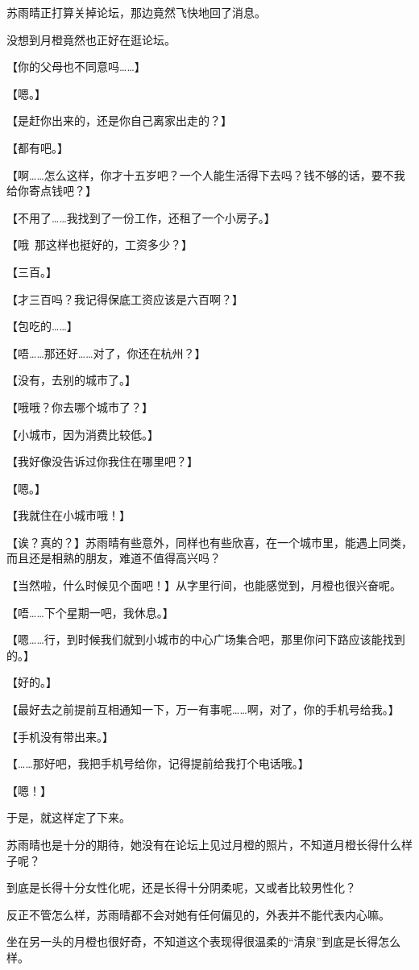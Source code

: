 苏雨晴正打算关掉论坛，那边竟然飞快地回了消息。

没想到月橙竟然也正好在逛论坛。

【你的父母也不同意吗……】

【嗯。】

【是赶你出来的，还是你自己离家出走的？】

【都有吧。】

【啊……怎么这样，你才十五岁吧？一个人能生活得下去吗？钱不够的话，要不我给你寄点钱吧？】

【不用了……我找到了一份工作，还租了一个小房子。】

【哦~那这样也挺好的，工资多少？】

【三百。】

【才三百吗？我记得保底工资应该是六百啊？】

【包吃的……】

【唔……那还好……对了，你还在杭州？】

【没有，去别的城市了。】

【哦哦？你去哪个城市了？】

【小城市，因为消费比较低。】

【我好像没告诉过你我住在哪里吧？】

【嗯。】

【我就住在小城市哦！】

【诶？真的？】苏雨晴有些意外，同样也有些欣喜，在一个城市里，能遇上同类，而且还是相熟的朋友，难道不值得高兴吗？

【当然啦，什么时候见个面吧！】从字里行间，也能感觉到，月橙也很兴奋呢。

【唔……下个星期一吧，我休息。】

【嗯……行，到时候我们就到小城市的中心广场集合吧，那里你问下路应该能找到的。】

【好的。】

【最好去之前提前互相通知一下，万一有事呢……啊，对了，你的手机号给我。】

【手机没有带出来。】

【……那好吧，我把手机号给你，记得提前给我打个电话哦。】

【嗯！】

于是，就这样定了下来。

苏雨晴也是十分的期待，她没有在论坛上见过月橙的照片，不知道月橙长得什么样子呢？

到底是长得十分女性化呢，还是长得十分阴柔呢，又或者比较男性化？

反正不管怎么样，苏雨晴都不会对她有任何偏见的，外表并不能代表内心嘛。

坐在另一头的月橙也很好奇，不知道这个表现得很温柔的“清泉”到底是长得怎么样。

